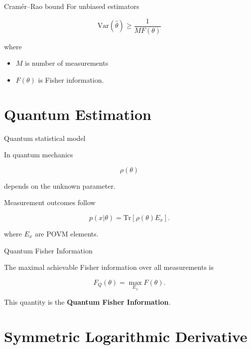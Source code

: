 \documentclass[aspectratio=169]{beamer}
\begin{document}
\begin{frame}{Cramér–Rao bound}
For unbiased estimators

\begin{equation}
\mathrm{Var}(\hat{\theta})
\ge
\frac{1}{M F(\theta)}
\end{equation}

where

\begin{itemize}
\item $M$ is number of measurements
\item $F(\theta)$ is Fisher information.
\end{itemize}
\end{frame}

\section{Quantum Estimation}

\begin{frame}{Quantum statistical model}

In quantum mechanics

\begin{equation}
\rho(\theta)
\end{equation}

depends on the unknown parameter.

Measurement outcomes follow

\begin{equation}
p(x|\theta)
=
\mathrm{Tr}[\rho(\theta) E_x].
\end{equation}

where $E_x$ are POVM elements.
\end{frame}

\begin{frame}{Quantum Fisher Information}

The maximal achievable Fisher information over all measurements is

\begin{equation}
F_Q(\theta)
=
\max_{E_x} F(\theta).
\end{equation}

This quantity is the \textbf{Quantum Fisher Information}.
\end{frame}

\section{Symmetric Logarithmic Derivative}
\end{document}
